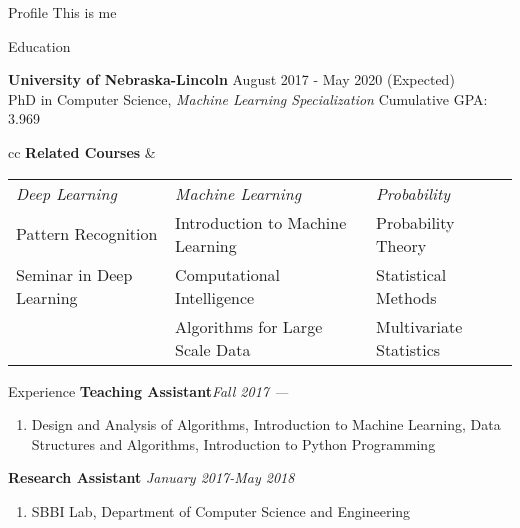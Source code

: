 \documentclass{resume} %
\newenvironment{cvEnum}
{ \begin{enumerate}[]
    \setlength{\itemsep}{0pt}
    \setlength{\parskip}{0pt}
    \setlength{\parsep}{0pt}     }
{ \end{enumerate}                  }
\begin{document}
\begin{rSection}{Profile}
  This is me
  \end{rSection}


\begin{rSection}{Education}

  {\bf University of Nebraska-Lincoln} \hfill { August 2017 - May
    2020} (Expected) 
\\ PhD in Computer Science, {\em Machine Learning Specialization} \hfill { Cumulative GPA: 3.969 }

                        \small{
\begin{tabular}{cc}
{\bf Related Courses} &
                        
\begin{tabular}{lll}
  {\em Deep Learning} & {\em Machine Learning} & {\em Probability} \\
Pattern Recognition & Introduction to Machine Learning & Probability Theory\\
Seminar in Deep Learning & Computational Intelligence & Statistical Methods\\
     & Algorithms for Large Scale Data  & Multivariate Statistics\\
\end{tabular}
\end{tabular}
                        }
\end{rSection}

\begin{rSection}{Experience}
{\bf Teaching Assistant}\hfill {\em Fall 2017 ---}
\begin{cvEnum}
\item Design and Analysis of Algorithms, Introduction to Machine
  Learning, Data Structures and Algorithms, Introduction to Python Programming  
\end{cvEnum}
{\bf Research Assistant} \hfill {\em January 2017-May 2018}
\begin{cvEnum}
\item SBBI Lab, Department of Computer Science and Engineering
    \end{cvEnum}

\end{rSection}


\end{document}
